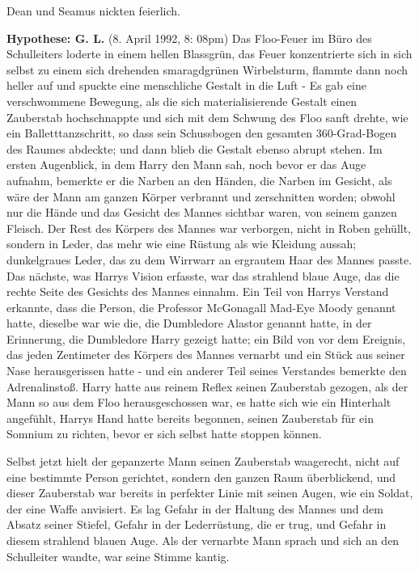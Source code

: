 Dean und Seamus nickten feierlich.

\textbf{Hypothese: G. L.} (8. April 1992, 8: 08pm) Das Floo-Feuer im Büro des
Schulleiters loderte in einem hellen Blassgrün, das Feuer konzentrierte sich in
sich selbst zu einem sich drehenden smaragdgrünen Wirbelsturm, flammte dann noch
heller auf und spuckte eine menschliche Gestalt in die Luft - Es gab eine
verschwommene Bewegung, als die sich materialisierende Gestalt einen Zauberstab
hochschnappte und sich mit dem Schwung des Floo sanft drehte, wie ein
Balletttanzschritt, so dass sein Schussbogen den gesamten 360-Grad-Bogen des
Raumes abdeckte; und dann blieb die Gestalt ebenso abrupt stehen. Im ersten
Augenblick, in dem Harry den Mann sah, noch bevor er das Auge aufnahm, bemerkte
er die Narben an den Händen, die Narben im Gesicht, als wäre der Mann am ganzen
Körper verbrannt und zerschnitten worden; obwohl nur die Hände und das Gesicht
des Mannes sichtbar waren, von seinem ganzen Fleisch. Der Rest des Körpers des
Mannes war verborgen, nicht in Roben gehüllt, sondern in Leder, das mehr wie
eine Rüstung als wie Kleidung aussah; dunkelgraues Leder, das zu dem Wirrwarr an
ergrautem Haar des Mannes passte. Das nächste, was Harrys Vision erfasste, war
das strahlend blaue Auge, das die rechte Seite des Gesichts des Mannes einnahm.
Ein Teil von Harrys Verstand erkannte, dass die Person, die Professor McGonagall
\glqq{}Mad-Eye Moody\grqq{} genannt hatte, dieselbe war wie die, die Dumbledore
\glqq{}Alastor\grqq{} genannt hatte, in der Erinnerung, die Dumbledore Harry
gezeigt hatte; ein Bild von vor dem Ereignis, das jeden Zentimeter des Körpers
des Mannes vernarbt und ein Stück aus seiner Nase herausgerissen hatte - und ein
anderer Teil seines Verstandes bemerkte den Adrenalinstoß. Harry hatte aus
reinem Reflex seinen Zauberstab gezogen, als der Mann so aus dem Floo
herausgeschossen war, es hatte sich wie ein Hinterhalt angefühlt, Harrys Hand
hatte bereits begonnen, seinen Zauberstab für ein Somnium zu richten, bevor er
sich selbst hatte stoppen können.

Selbst jetzt hielt der gepanzerte Mann seinen Zauberstab waagerecht, nicht auf
eine bestimmte Person gerichtet, sondern den ganzen Raum überblickend, und
dieser Zauberstab war bereits in perfekter Linie mit seinen Augen, wie ein
Soldat, der eine Waffe anvisiert. Es lag Gefahr in der Haltung des Mannes und
dem Absatz seiner Stiefel, Gefahr in der Lederrüstung, die er trug, und Gefahr
in diesem strahlend blauen Auge. Als der vernarbte Mann sprach und sich an den
Schulleiter wandte, war seine Stimme kantig.

